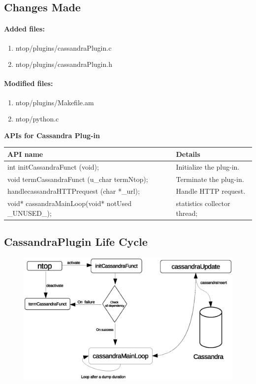\subsection{Changes Made}
\paragraph{Added files:}
\begin{enumerate}
 \item ntop/plugins/cassandraPlugin.c
 \item ntop/plugins/cassandraPlugin.h
\end{enumerate}
\paragraph{Modified files:}
\begin{enumerate}
 \item ntop/plugins/Makefile.am
 \item ntop/python.c
\end{enumerate}

\textbf{APIs for Cassandra Plug-in}\\

\begin{tabular}{|l|l|}
\hline
 \textbf{API name} &  \textbf{Details}\\
\hline
 int initCassandraFunct (void); & Initialize the plug-in.\\
 \hline
 void termCassandraFunct (u\_char termNtop); & Terminate the plug-in.\\
 \hline
 handlecassandraHTTPrequest (char *\_url); & Handle HTTP request.\\
 \hline
  void* cassandraMainLoop(void* notUsed \_UNUSED\_); & statistics collector thread;\\
  \hline
\end{tabular}

\subsection{CassandraPlugin Life Cycle}
          \begin{figure}[htb]
	    \centering
	    \includegraphics[scale = .5]{lfc.eps}
	  \end{figure}


